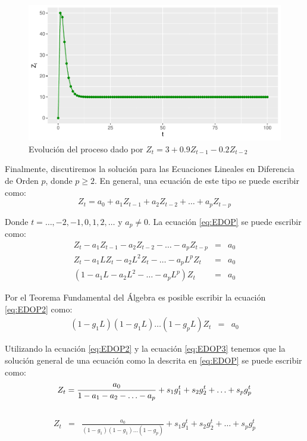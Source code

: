 \documentclass[
]{book}
\begin{document}
\begin{figure}

{\centering \includegraphics{Notas-Series-Tiempo_files/figure-latex/fig23-1} 

}

\caption{Evolución del proceso dado por $Z_t =3+0.9Z_{t-1}-0.2Z_{t-2}$}\label{fig:fig23}
\end{figure}

Finalmente, discutiremos la solución para las Ecuaciones Lineales en Diferencia de Orden \(p\), donde \(p \geq 2\). En general, una ecuación de este tipo se puede escribir como:
\begin{equation}
    Z_t = a_0 + a_1 Z_{t-1} + a_2 Z_{t-2} + \ldots + a_p Z_{t-p}
    \label{eq:EDOP}
\end{equation}

Donde \(t = \ldots, -2, -1, 0, 1, 2, \ldots\) y \(a_p \neq 0\). La ecuación \eqref{eq:EDOP} se puede escribir como:
\begin{eqnarray}
    Z_t - a_1 Z_{t-1} - a_2 Z_{t-2} - \ldots - a_p Z_{t-p} & = & a_0 \nonumber \\
    Z_t - a_1 L Z_t - a_2 L^2 Z_t - \ldots - a_p L^p Z_t & = & a_0 \nonumber \\
    (1 - a_1 L - a_2 L^2 - \ldots - a_p L^p) Z_t & = & a_0
    \label{eq:EDOP2}
\end{eqnarray}

Por el Teorema Fundamental del Álgebra es posible escribir la ecuación \eqref{eq:EDOP2} como:
\begin{eqnarray}
    (1 - g_1 L)(1 - g_1 L) \ldots (1 - g_p L) Z_t & = & a_0
    \label{eq:EDOP3}
\end{eqnarray}

Utilizando la ecuación \eqref{eq:EDOP2} y la ecuación \eqref{eq:EDOP3} tenemos que la solución general de una ecuación como la descrita en \eqref{eq:EDOP} se puede escribir como:
\begin{equation}
    Z_t  =  \frac{a_0}{1 - a_1 - a_2 - \ldots - a_p} + s_1 g^t_1 + s_2 g^t_2 + \ldots + s_p g^t_p \\
    \label{eq:EDOPGEN}
\end{equation}\\
\begin{eqnarray}
    Z_t & = & \frac{a_0}{(1 - g_1)(1 - g_1) \ldots (1 - g_p)} + s_1 g^t_1 + s_2 g^t_2 + \ldots + s_p g^t_p 
    \label{eq:EDOPGEN2}
\end{eqnarray}
\end{document}
